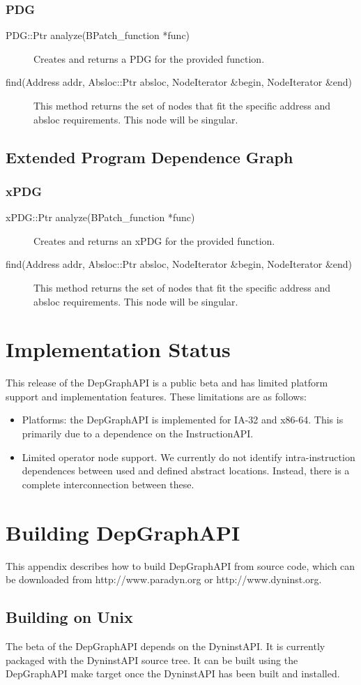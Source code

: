 \documentclass[12pt,titlepage]{article}
\begin{document}
\subsubsection{PDG}
\begin{description}
\item[PDG::Ptr analyze(BPatch\_function *func)]
Creates and returns a PDG for the provided function.
\item[find(Address addr, Absloc::Ptr absloc, NodeIterator \&begin, NodeIterator \&end) ]
This method returns the set of nodes that fit the specific address and absloc requirements. This node will be singular.
\end{description}

\subsection{Extended Program Dependence Graph}
\subsubsection{xPDG}
\begin{description}
\item[xPDG::Ptr analyze(BPatch\_function *func)]
Creates and returns an xPDG for the provided function.
\item[find(Address addr, Absloc::Ptr absloc, NodeIterator \&begin, NodeIterator \&end) ]
This method returns the set of nodes that fit the specific address and absloc requirements. This node will be singular.
\end{description}

\section{Implementation Status}

This release of the DepGraphAPI is a public beta and has limited
platform support and implementation features. These limitations are as
follows:
\begin{itemize}
\item Platforms: the DepGraphAPI is implemented for IA-32 and
  x86-64. This is primarily due to a dependence on the InstructionAPI.
\item Limited operator node support. We currently do not identify
  intra-instruction dependences between used and defined abstract
  locations. Instead, there is a complete interconnection between
  these. 
\end{itemize}


\section{Building DepGraphAPI}
This appendix describes how to build DepGraphAPI from source code,
which can be downloaded from http://www.paradyn.org or
http://www.dyninst.org.

\subsection{Building on Unix}
The beta of the DepGraphAPI depends on the DyninstAPI. It is currently
packaged with the DyninstAPI source tree. It can be built using the
DepGraphAPI make target once the DyninstAPI has been built and
installed.
\end{document}
